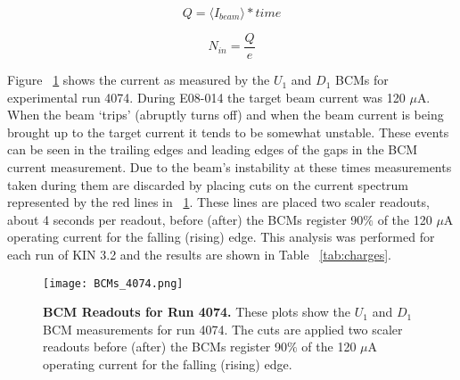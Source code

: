 \begin{equation} \label{eq:charge}
	Q = \langle I_{beam} \rangle *time
\end{equation}

\begin{equation} \label{eq:electrons}
	N_{in} = \frac{Q}{e}
\end{equation}

Figure ~\ref{fig:bcms_4074} shows the current as measured by the $U_1$ and $D_1$ BCMs for experimental run 4074. During E08-014 the target beam current was 120 $\mu$A. When the beam `trips' (abruptly turns off) and when the beam current is being brought up to the target current it tends to be somewhat unstable. These events can be seen in the trailing edges and leading edges of the gaps in the BCM current measurement. Due to the beam's instability at these times measurements taken during them are discarded by placing cuts on the current spectrum represented by the red lines in ~\ref{fig:bcms_4074}. These lines are placed two scaler readouts, about 4 seconds per readout, before (after) the BCMs register 90$\%$ of the 120 $\mu$A operating current for the falling (rising) edge. This analysis was performed for each run of KIN 3.2 and the results are shown in Table ~\ref{tab:charges}.

\begin{figure}[!ht]
\begin{center}
\texttt{[image: BCMs\_4074.png]}
\end{center}
\caption{
{\bf{BCM Readouts for Run 4074.}} These plots show the $U_1$ and $D_1$ BCM measurements for run 4074. The cuts are applied two scaler readouts before (after) the BCMs register 90$\%$ of the 120 $\mu$A operating current for the falling (rising) edge.}
\label{fig:bcms_4074}
\end{figure}

